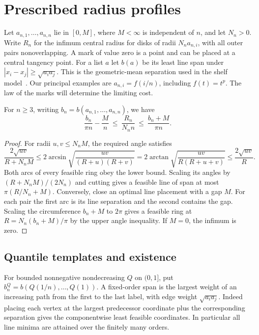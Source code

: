 \section{Prescribed radius profiles}\label{sec:profiles}

Let \(a_{n,1},\ldots,a_{n,n}\) lie in \([0,M]\), where \(M<\infty\) is
independent of \(n\), and let \(N_n>0\). Write \(R_n\) for the infimum
central radius for disks of radii \(N_na_{n,i}\), with all outer pairs
nonoverlapping. A mark of value zero is a point and can be placed at a
central tangency point. For a list \(a\) let \(b(a)\) be its least line
span under \(|x_i-x_j|\ge\sqrt{a_ia_j}\). This is the geometric-mean
separation used in the shelf model~\cite{shelf}. Our principal examples
are \(a_{n,i}=f(i/n)\), including \(f(t)=t^p\). The law of the marks will
determine the limiting cost.

\begin{lemma}\label{lem:profile-squeeze}
For \(n\ge3\), writing \(b_n=b(a_{n,1},\ldots,a_{n,n})\), we have
\begin{equation}\label{eq:profile-squeeze}
 \frac{b_n}{\pi n}-\frac{M}{n}\ \le\ \frac{R_n}{N_n n}\
 \le\ \frac{b_n+M}{\pi n}.
\end{equation}
\end{lemma}
\begin{proof}
For radii \(u,v\le N_nM\), the required angle satisfies
\[
 \frac{2\sqrt{uv}}{R+N_nM}\le
 2\arcsin\sqrt{\frac{uv}{(R+u)(R+v)}}=
 2\arctan\sqrt{\frac{uv}{R(R+u+v)}}\le\frac{2\sqrt{uv}}R .
\]
Both arcs of every feasible ring obey the lower bound. Scaling its angles
by \((R+N_nM)/(2N_n)\) and cutting gives a feasible line of span at most
\(\pi(R/N_n+M)\). Conversely, close an optimal line placement with a gap
\(M\). For each pair the first arc is its line separation and the second
contains the gap. Scaling the circumference \(b_n+M\) to \(2\pi\) gives
a feasible ring at \(R=N_n(b_n+M)/\pi\) by the upper angle inequality.
If \(M=0\), the infimum is zero.
\end{proof}

\subsection{Quantile templates and existence}

For bounded nonnegative nondecreasing \(Q\) on \((0,1]\), put
\(b_n^Q=b(Q(1/n),\ldots,Q(1))\). A fixed-order span is the largest
weight of an increasing path from the first to the last label, with
edge weight \(\sqrt{a_i a_j}\). Indeed placing each vertex at the largest
predecessor coordinate plus the corresponding separation gives the
componentwise least feasible coordinates. In particular all line minima
are attained over the finitely many orders.

